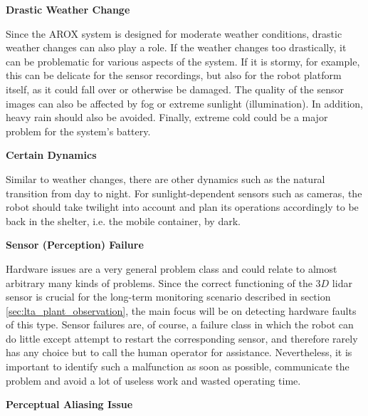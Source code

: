 \documentclass[english, master, utf8]{base/thesis_KBS}
\begin{document}
\noindent
\textbf{Drastic Weather Change}\newline

\noindent
Since the AROX system is designed for moderate weather conditions, drastic weather changes can also play a role.
If the weather changes too drastically, it can be problematic for various aspects of the system.
If it is stormy, for example, this can be delicate for the sensor recordings, but also for the robot platform itself, as it could fall over or otherwise be damaged.
The quality of the sensor images can also be affected by fog or extreme sunlight (illumination).
In addition, heavy rain should also be avoided. Finally, extreme cold could be a major problem for the system's battery.\newline

\noindent
\textbf{Certain Dynamics}\newline

\noindent
Similar to weather changes, there are other dynamics such as the natural transition from day to night. For sunlight-dependent sensors such as cameras, 
the robot should take twilight into account and plan its operations accordingly to be back in the shelter, i.e. the mobile container, by dark.\newline

\noindent
\textbf{Sensor (Perception) Failure}\newline

\noindent
Hardware issues are a very general problem class and could relate to almost arbitrary many kinds of problems. Since the correct functioning of the $3D$ lidar sensor is
crucial for the long-term monitoring scenario described in section \ref{sec:lta_plant_observation}, the main focus will be on detecting hardware faults of this type. 
Sensor failures are, of course, a failure class in which the robot can do little except attempt to restart the corresponding sensor, and therefore rarely has any choice but to 
call the human operator for assistance. Nevertheless, it is important to identify such a malfunction as soon as possible, communicate the problem and avoid a lot of useless work 
and wasted operating time.\newline

\noindent
\textbf{Perceptual Aliasing Issue}\newline
\end{document}
